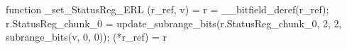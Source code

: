 function _set_StatusReg_ERL (r_ref, v) = {
    r = __bitfield_deref(r_ref);
    r.StatusReg_chunk_0 = update_subrange_bits(r.StatusReg_chunk_0, 2, 2, subrange_bits(v, 0, 0));
    (*r_ref) = r
}
